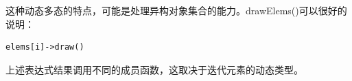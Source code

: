 这种动态多态的特点，可能是处理异构对象集合的能力。drawElems()可以很好的说明：

\begin{lstlisting}[style=styleCXX]
elems[i]->draw()
\end{lstlisting}

上述表达式结果调用不同的成员函数，这取决于迭代元素的动态类型。


























